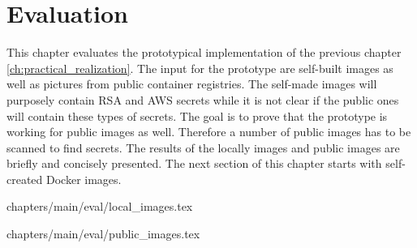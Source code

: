 \chapter{Evaluation}
\label{ch:eval}
This chapter evaluates the prototypical implementation of the previous chapter \ref{ch:practical_realization}. 
The input for the prototype are self-built images as well as pictures from public container registries. The self-made images will purposely contain RSA and AWS secrets while it is not clear if the public ones will contain these types of secrets. The goal is to prove that the prototype is working for public images as well. Therefore a number of public images has to be scanned to find secrets.
The results of the locally images and public images are briefly and concisely presented.
The next section of this chapter starts with self-created Docker images.

 {chapters/main/eval/local_images.tex}

 {chapters/main/eval/public_images.tex}